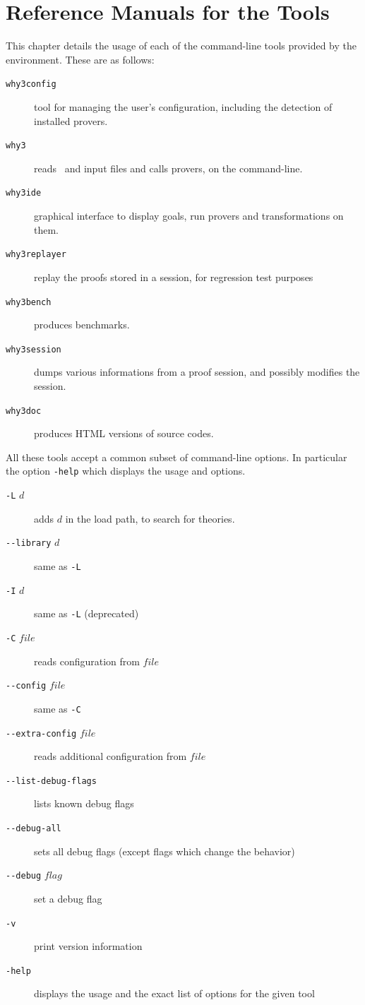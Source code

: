 \chapter{Reference Manuals for the \why Tools}
\label{chap:manpages}

This chapter details the usage of each of the command-line tools
provided by the \why environment. These are as follows:
\begin{description}
\item[\texttt{why3config}] tool for managing the user's configuration,
  including the detection of installed provers.
\item[\texttt{why3}] reads \why\ and \whyml input files and calls
  provers, on the command-line.
\item[\texttt{why3ide}] graphical interface to display goals, run
  provers and transformations on them.
\item[\texttt{why3replayer}] replay the proofs stored in a session,
  for regression test purposes
\item[\texttt{why3bench}] produces benchmarks.
\item[\texttt{why3session}] dumps various informations from a proof
  session, and possibly modifies the session.
\item[\texttt{why3doc}] produces HTML versions of \why source codes.
\end{description}

All these tools accept a common subset of command-line options. In
particular the option \verb|-help| which displays the usage and options.
\begin{description}
\item[\texttt{-L} $d$]
  adds $d$ in the load path, to search for theories.
\item[\texttt{-{}-library} $d$]
  same as \verb|-L|
\item[\texttt{-I} $d$]
  same as \verb|-L| (deprecated)
\item[\texttt{-C} $file$]
  reads configuration from $file$
\item[\texttt{-{}-config} $file$]
  same as \verb|-C|
\item[\texttt{-{}-extra-config} $file$]
  reads additional configuration from $file$
\item[\texttt{-{}-list-debug-flags}]
  lists known debug flags
\item[\texttt{-{}-debug-all}]
  sets all debug flags (except flags which change the behavior)
\item[\texttt{-{}-debug} $flag$]
  set a debug flag
\item[\texttt{-v}]
  print version information
\item[\texttt{-help}]
  displays the usage and the exact list of options for the given tool
\end{description}


